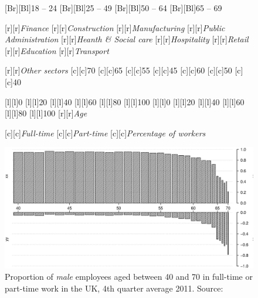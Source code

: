 \documentclass[11 pt, a4paper]{report}
\begin{document}
\begin{figure}[hbtp!]
[Br][Bl]{\small{18 -- 24}}
[Br][Bl]{\small{25 -- 49}}
[Br][Bl]{\small{50 -- 64}}
[Br][Bl]{\small{65 -- 69}}


[r][r]{\small{\emph{Finance}}}
[r][r]{\small{\emph{Construction}}}
[r][r]{\small{\emph{Manufacturing}}}
[r][r]{\small{\emph{Public Administration}}}
[r][r]{\small{\emph{Heanth \& Social care}}}
[r][r]{\small{\emph{Hospitality}}}
[r][r]{\small{\emph{Retail}}}
[r][r]{\small{\emph{Education}}}
[r][r]{\small{\emph{Transport}}}

[r][r]{\small{\emph{Other sectors}}}
[c][c]{\small{70}}
[c][c]{\small{65}}
[c][c]{\small{55}}
[c][c]{\small{45}}
[c][c]{\small{60}}
[c][c]{\small{50}}
[c][c]{\small{40}}

[l][l]{\small{0}}
[l][l]{\small{20}}
[l][l]{\small{40}}
[l][l]{\small{60}}
[l][l]{\small{80}}
[l][l]{\small{100}}
[l][l]{\small{0}}
[l][l]{\small{20}}
[l][l]{\small{40}}
[l][l]{\small{60}}
[l][l]{\small{80}}
[l][l]{\small{100}}
[r][r]{\small{\emph{Age}}}

[c][c]{\small{\emph{Full-time}}}
[c][c]{\small{\emph{Part-time}}}
[c][c]{\small{\emph{Percentage of workers}}}

\includegraphics[width=\textwidth]{../figures/Fig5.2.eps}
\caption{Proportion of \emph{male} employees aged between 40 and 70 in full-time or part-time work in the UK, 4th quarter average 2011. Source: \cite{DWP2013}}\label{Fig:53}
\end{figure}
\end{document}
